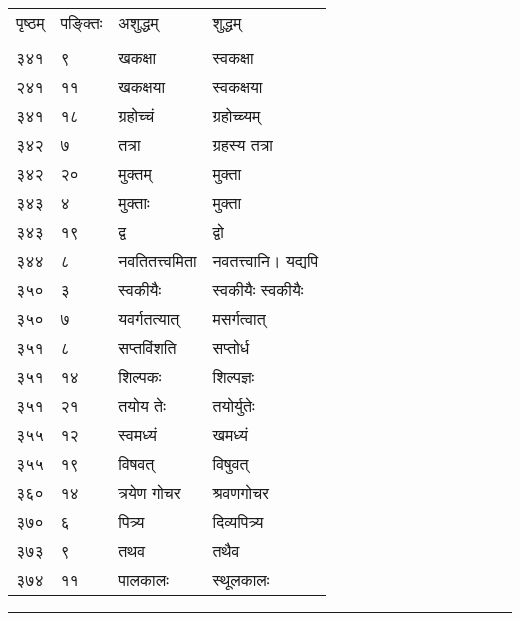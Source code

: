 \documentclass[11pt, openany]{book}
\begin{document}
\begin{longtable}{p{1cm} p{1.5cm} p{4cm} p{4cm}}
 पृष्ठम् & पङ्क्तिः &  अशुद्धम् & शुद्धम्\\
\vspace{2mm}\\

 ३४१ & ९ & खकक्षा & स्वकक्षा \\

 २४१ & ११ & खकक्षया & स्वकक्षया \\

 ३४१ & १८ & ग्रहोच्चं & ग्रहोच्च्यम् \\

 ३४२ & ७ & तत्रा & ग्रहस्य तत्रा \\

 ३४२ & २० & मुक्तम् & मुक्ता \\

 ३४३ & ४ & मुक्ताः & मुक्ता \\

 ३४३ & १९ & द्व &  द्वो \\

 ३४४ & ८ & नवतितत्त्वमिता & नवतत्त्वानि। यद्यपि \\

 ३५० & ३ & स्वकीयैः & स्वकीयैः स्वकीयैः \\

 ३५० & ७ & यवर्गतत्यात् & मसर्गत्वात् \\

 ३५१ & ८ & सप्तविंशति & सप्तोर्ध \\

 ३५१ & १४ & शिल्पकः & शिल्पज्ञः \\

 ३५१ & २१ & तयोय तेः & तयोर्युतेः \\

 ३५५ & १२ & स्वमध्यं  & खमध्यं \\

 ३५५ & १९ & विषवत् & विषुवत् \\

 ३६० & १४ & त्रयेण गोचर & श्रवणगोचर \\

 ३७० & ६ & पित्र्य & दिव्यपित्र्य \\

 ३७३ & ९ & तथव & तथैव \\

 ३७४ & ११ & पालकालः & स्थूलकालः \\
\end{longtable}

\begin{center}
    \rule{8em}{.5pt}
\end{center}



 
\end{document}

